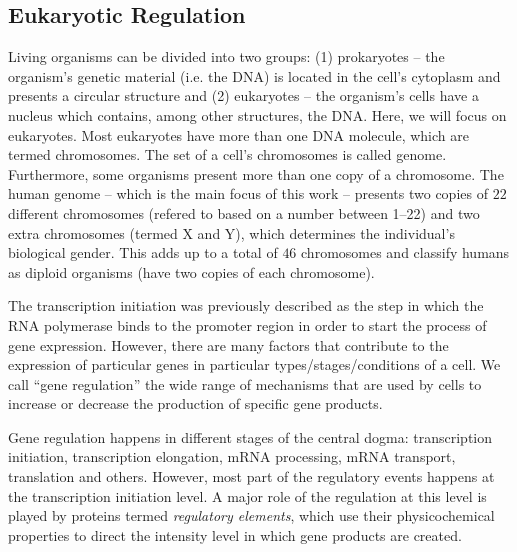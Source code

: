 \subsection{Eukaryotic Regulation}
\label{sec:eukaryotic.regulation}

Living organisms can be divided into two groups: (1) prokaryotes -- the organism's genetic material (i.e. the DNA) is located in the cell's cytoplasm and presents a circular structure and (2) eukaryotes -- the organism's cells have a nucleus which contains, among other structures, the DNA. Here, we will focus on eukaryotes. Most eukaryotes have more than one DNA molecule, which are termed chromosomes. The set of a cell's chromosomes is called genome. Furthermore, some organisms present more than one copy of a chromosome. The human genome -- which is the main focus of this work -- presents two copies of $22$ different chromosomes (refered to based on a number between 1--22) and two extra chromosomes (termed X and Y), which determines the individual's biological gender. This adds up to a total of $46$ chromosomes and classify humans as diploid organisms (have two copies of each chromosome).

The transcription initiation was previously described as the step in which the RNA polymerase binds to the promoter region in order to start the process of gene expression. However, there are many factors that contribute to the expression of particular genes in particular types/stages/conditions of a cell. We call ``gene regulation'' the wide range of mechanisms that are used by cells to increase or decrease the production of specific gene products.

Gene regulation happens in different stages of the central dogma: transcription initiation, transcription elongation, mRNA processing, mRNA transport, translation and others. However, most part of the regulatory events happens at the transcription initiation level. A major role of the regulation at this level is played by proteins termed \emph{regulatory elements}, which use their physicochemical properties to direct the intensity level in which gene products are created.

